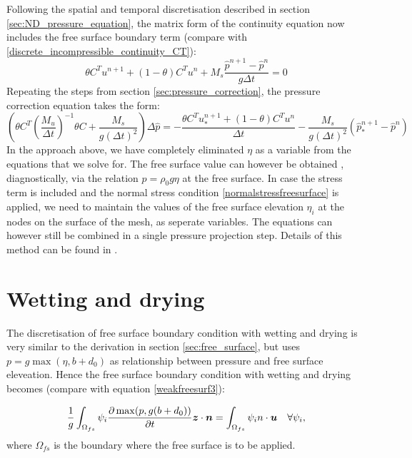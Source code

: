 Following the spatial and temporal discretisation described in section \ref{sec:ND_pressure_equation},
the matrix form of the continuity equation now includes the free surface boundary term (compare with
\eqref{discrete_incompressible_continuity_CT}):
\begin{equation}
\theta C^T u^{n+1} + (1-\theta) C^T u^n + M_s \frac{\hat p^{n+1}-\hat p^n}{g \Delta t}=0
\end{equation}
Repeating the steps from section \ref{sec:pressure_correction}, the pressure correction equation takes the form:
\begin{equation}
\left(\theta C^T(\frac{M_u}{\Delta t})^{-1} \theta C + \frac{M_s}{g(\Delta t)^2}\right)\Delta \hat p = -\frac{\theta C^T u_*^{n+1} + (1-\theta)C^Tu^n}{\Delta t}-\frac{M_s}{g(\Delta t)^2}(\hat p_*^{n+1}-\hat p^n)
\end{equation}
In the approach above, we have completely eliminated $\eta$ as a variable from
the equations that we solve for. The free surface value can however be obtained
, diagnostically, via the relation $p=\rho_0g\eta$ at the free surface. In case
the stress term is included and the normal stress condition \eqref{normalstressfreesurface} is applied,
we need to maintain the values of the free surface elevation $\eta_i$ at the
nodes on the surface of the mesh, as seperate variables. The equations can
however still be combined in a single pressure projection step. Details of this
method can be found in \citet{kramer2012}.

\section{Wetting and drying}\label{sec:wetting_and_drying}
The discretisation of free surface boundary condition with wetting and drying is very similar to the derivation in section \ref{sec:free_surface},
but uses $p=g\max(\eta, b+d_0)$ as relationship between pressure and free surface eleveation. Hence the free surface boundary condition with wetting and drying becomes (compare with equation \ref{weakfreesurf3}):

\begin{equation}\label{weakfreesurf3_wd}
\frac{1}{g} \int_{\Omega_{fs}} {\psi_i }\frac{\partial \max(p, g(b+d_0))}{\partial t}{\mbox{\boldmath$z$}} \cdot {\mbox{\boldmath$n$}}=\int_{\Omega_{fs}} \psi_i {n \cdot {\mbox{\boldmath$u$}}} \quad
  \forall \psi_i,
\end{equation}
where $\Omega_{fs}$ is the boundary where the free surface is to be applied.

